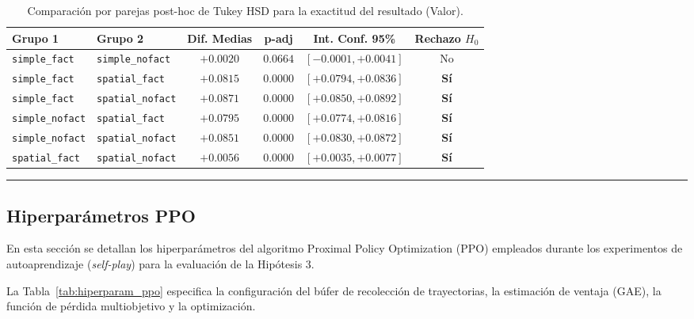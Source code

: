 \documentclass[12pt, a4paper]{article}
\begin{document}
\begin{table}[htbp]
    \centering
    \small
    \begin{tabular}{|l|l|c|c|c|c|}
    \hline
    \textbf{Grupo 1} & \textbf{Grupo 2} & \textbf{Dif. Medias} & \textbf{p-adj} & \textbf{Int. Conf. 95\%} & \textbf{Rechazo $H_0$} \\
    \hline
    \texttt{simple\_fact} & \texttt{simple\_nofact} & $+0.0020$ & $0.0664$ & $[-0.0001, +0.0041]$ & No \\
    \texttt{simple\_fact} & \texttt{spatial\_fact} & $+0.0815$ & $0.0000$ & $[+0.0794, +0.0836]$ & \textbf{Sí} \\
    \texttt{simple\_fact} & \texttt{spatial\_nofact} & $+0.0871$ & $0.0000$ & $[+0.0850, +0.0892]$ & \textbf{Sí} \\
    \texttt{simple\_nofact} & \texttt{spatial\_fact} & $+0.0795$ & $0.0000$ & $[+0.0774, +0.0816]$ & \textbf{Sí} \\
    \texttt{simple\_nofact} & \texttt{spatial\_nofact} & $+0.0851$ & $0.0000$ & $[+0.0830, +0.0872]$ & \textbf{Sí} \\
    \texttt{spatial\_fact} & \texttt{spatial\_nofact} & $+0.0056$ & $0.0000$ & $[+0.0035, +0.0077]$ & \textbf{Sí} \\
    \hline
    \end{tabular}
    \caption[Comparación estadística usando Tukey HSD para el valor]{Comparación por parejas post-hoc de Tukey HSD para la exactitud del resultado (Valor).}
    \label{tab:tukey_res}
\end{table}

\newpage
\rule{\textwidth}{0.2pt}
\subsection{Hiperparámetros PPO}\label{sec:hiperparam_ppo}

En esta sección se detallan los hiperparámetros del algoritmo Proximal Policy Optimization (PPO) empleados durante los experimentos de autoaprendizaje (\textit{self-play}) para la evaluación de la Hipótesis 3.

La Tabla~\ref{tab:hiperparam_ppo} especifica la configuración del búfer de recolección de trayectorias, la estimación de ventaja (GAE), la función de pérdida multiobjetivo y la optimización.
\end{document}
